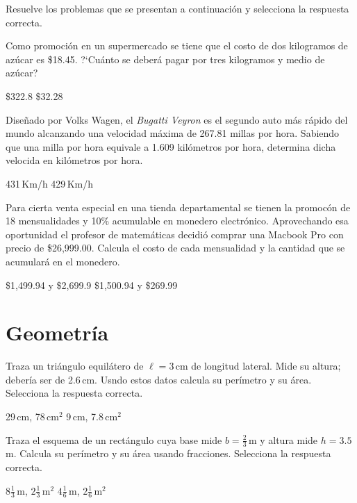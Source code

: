 \documentclass[11pt]{article}
\begin{document}
Resuelve los problemas que se presentan a continuaci\'on y selecciona la
respuesta correcta.

\vspace{5mm}

Como promoci\'on en un supermercado se tiene que el costo de dos kilogramos de
az\'ucar es \$18.45. ?`Cu\'anto se deber\'a pagar por tres kilogramos y medio de
az\'ucar?

\hfill {} \$322.8 \qquad {} \$32.28

\vspace{5cm}

Dise\~nado por Volks Wagen,  el \textit{Bugatti Veyron} es el segundo auto m\'as
r\'apido del mundo alcanzando una velocidad m\'axima de 267.81 millas por hora.
Sabiendo que una milla por hora equivale a 1.609 kil\'ometros por hora,
determina dicha velocida en kil\'ometros por hora.

\hfill {} 431\,Km/h \qquad {} 429\,Km/h 

\vspace{4cm}

Para cierta venta especial en una tienda departamental se tienen la promoc\'on
de 18 mensualidades y 10\% acumulable en monedero electr\'onico. Aprovechando
esa oportunidad el profesor de matem\'aticas decidi\'o comprar una Macbook Pro
con precio de \$26,999.00. Calcula el costo de cada mensualidad y la cantidad
que se acumular\'a en el monedero.

\hfill {} \$1,499.94 y \$2,699.9 \qquad {} \$1,500.94 y \$269.99 

\vspace{4cm}

\section{Geometr\'ia}

Traza un tri\'angulo equil\'atero de $\ell=3$\,cm de longitud lateral. Mide su
altura; deber\'ia ser de 2.6\,cm. Usndo estos datos calcula su per\'imetro y su
\'area. Selecciona la respuesta correcta.

\hfill {} 29\,cm, 78\,cm$^{2}$ \qquad {} 9\,cm, 7.8\,cm$^{2}$

\newpage
Traza el esquema de un rect\'angulo cuya base mide $b=\frac{2}{3}$\,m y altura
mide $h=3.5$\,m. Calcula su per\'imetro y su \'area usando fracciones.
Selecciona la respuesta correcta.

\hfill {} $8 \frac{1}{3}$\,m, $2 \frac{1}{3}$\,m$^{2}$ \qquad {} 
$4\frac{1}{6}$\,m, $2 \frac{1}{6}$\,m$^{2}$
\end{document}
